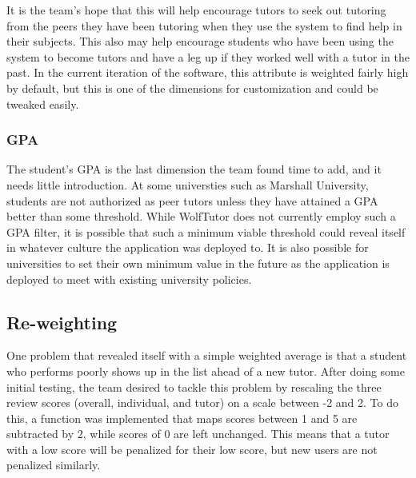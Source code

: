 It is the team's hope that this will help encourage tutors to seek out tutoring
from the peers they have been tutoring when they use the system to find help in
their subjects. This also may help encourage students who have been using the
system to become tutors and have a leg up if they worked well with a tutor in
the past.  In the current iteration of the software, this attribute is weighted
fairly high by default, but this is one of the dimensions for customization and
could be tweaked easily.  

\subsubsection{GPA}
The student's GPA is the last dimension the team found time to add, and it needs
little introduction. At some universties such as Marshall University, students
are not authorized as peer tutors unless they have attained a GPA better than
some threshold. While WolfTutor does not currently employ such a GPA filter, it
is possible that such a minimum viable threshold could reveal itself in whatever
culture the application was deployed to.  It is also possible for universities
to set their own minimum value in the future as the application is deployed to
meet with existing university policies.

\subsection{Re-weighting}
One problem that revealed itself with a simple weighted average
is that a student who performs poorly shows up in the list ahead of a
new tutor.  After doing some initial testing, the team desired to tackle this
problem by rescaling the three review scores (overall, individual, and tutor) on
a scale between -2 and 2.  To do this, a function was implemented that maps
scores between 1 and 5 are subtracted by 2, while scores of 0 are left
unchanged.  This means that a tutor with a low score will be penalized for their
low score, but new users are not penalized similarly.

